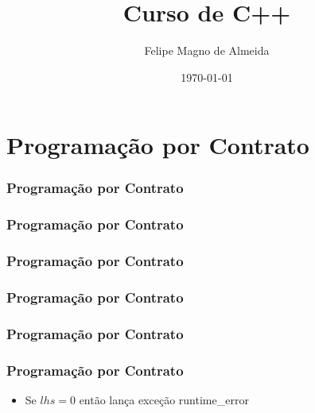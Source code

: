 \documentclass[14pt]{beamer}
\title{Curso de C++}
\author{Felipe Magno de Almeida}
\date{\today}
\begin{document}
\frame
{
  \titlepage
}

\frame
{
  \tableofcontents
}

\section{Programação por Contrato}

\newsavebox{\listingboxa}
\begin{lrbox}{\listingboxa}

\end{lrbox}

\frame
{
  \frametitle{Programação por Contrato}

  \usebox{\listingboxa}
}

\newsavebox{\listingboxb}
\begin{lrbox}{\listingboxb}

\end{lrbox}

\frame
{
  \frametitle{Programação por Contrato}

  \usebox{\listingboxb}
}

\newsavebox{\listingboxc}
\begin{lrbox}{\listingboxc}

\end{lrbox}

\frame
{
  \frametitle{Programação por Contrato}

  \usebox{\listingboxc}
}

\newsavebox{\listingboxd}
\begin{lrbox}{\listingboxd}

\end{lrbox}

\frame
{
  \frametitle{Programação por Contrato}

  \usebox{\listingboxd}
}

\newsavebox{\listingboxe}
\begin{lrbox}{\listingboxe}

\end{lrbox}

\frame
{
  \frametitle{Programação por Contrato}

  \usebox{\listingboxe}
}

\frame
{
  \frametitle{Programação por Contrato}

  \usebox{\listingboxd}

  \begin{itemize}
  \item Se $lhs = 0$ então lança exceção runtime\_error
  \end{itemize}
}
\end{document}
